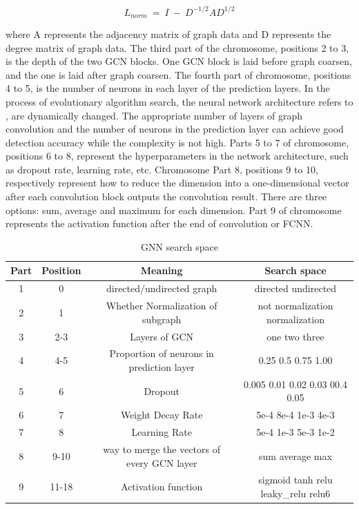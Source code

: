 \documentclass[lettersize,journal]{IEEEtran}
\begin{document}
\begin{equation}
\label{deqn_ex_8}
L_{norm}\ =\ I\ -\ D^{-1/2}AD^{1/2}
\end{equation}

where A represents the adjacency matrix of graph data and D represents the degree matrix of graph data. The third part of the chromosome, positions 2 to 3, is the depth of the two GCN blocks. One GCN block is laid before graph coarsen, and the one is laid after graph coarsen. The fourth part of chromosome, positions 4 to 5, is the number of neurons in each layer of the prediction layers. In the process of evolutionary algorithm search, the neural network architecture refers to \cite{62, 67}, are dynamically changed. The appropriate number of layers of graph convolution and the number of neurons in the prediction layer can achieve good detection accuracy while the complexity is not high. Parts 5 to 7 of chromosome, positions 6 to 8, represent the hyperparameters in the network architecture, such as dropout rate, learning rate, etc. Chromosome Part 8, positions 9 to 10, respectively represent how to reduce the dimension into a one-dimensional vector after each convolution block outputs the convolution result. There are three options: sum, average and maximum for each dimension. Part 9 of chromosome represents the activation function after the end of convolution or FCNN.

\begin{table}[!t]
\caption{GNN search space\label{table1}}
\centering
\begin{tabular}{cccc}
\hline
Part & Position & Meaning	 & Search space\\
\hline
1 & 0 & directed/undirected graph & directed undirected\\
2 & 1 & Whether Normalization of subgraph & not normalization normalization\\
3 & 2-3 & Layers of GCN & one two three\\
4 & 4-5 & Proportion of neurons in prediction layer & 0.25 0.5 0.75 1.00\\
5 & 6	 & Dropout & 0.005 0.01 0.02 0.03 00.4 0.05\\
6 & 7 & Weight Decay Rate & 5e-4 8e-4 1e-3 4e-3\\
7 & 8	 & Learning Rate & 5e-4 1e-3 5e-3 1e-2\\
8 & 9-10 & way to merge the vectors of every GCN layer & sum average max\\
9 & 11-18 & Activation function & sigmoid tanh relu  leaky\_relu relu6\\
\hline
\end{tabular}
\end{table}
\end{document}
